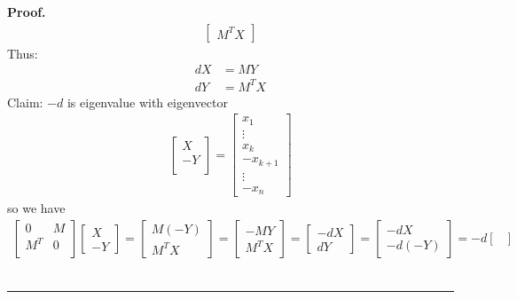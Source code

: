 \documentclass[12pt]{article}
\newenvironment{proof}[1][Proof]{\textbf{#1.} }{\ \rule{0.5em}{0.5em}}
\begin{document}
\begin{proof}
\begin{align}
\begin{bmatrix}
            M^T X
        \end{bmatrix}
    \end{align}
    Thus:
    \begin{align}
        dX &= MY \\
        dY &= M^T X
    \end{align}
    Claim: $-d$ is eigenvalue with eigenvector 
    \begin{align}
        \begin{bmatrix}
            X\\
            -Y\\
        \end{bmatrix} =
        \begin{bmatrix}
            x_1\\
            \vdots\\
            x_k\\
            -x_{k+1}\\
            \vdots\\
            -x_n
        \end{bmatrix}
    \end{align}
    so we have
    \begin{align}
        \begin{bmatrix}
            0 & M \\
            M^T & 0 \\
        \end{bmatrix}
        \begin{bmatrix}
            X \\
            -Y
        \end{bmatrix}
        =
        \begin{bmatrix}
            M(-Y)\\
            M^T X
        \end{bmatrix}
        =
        \begin{bmatrix}
            -M Y\\
            M^T X
        \end{bmatrix}
        =
        \begin{bmatrix}
            -dX\\
            dY
        \end{bmatrix}
        =
        \begin{bmatrix}
            -dX \\
            -d(-Y)
        \end{bmatrix}
        = -d
        \begin{bmatrix}

\end{bmatrix}
\end{align}
\end{proof}
\end{document}
